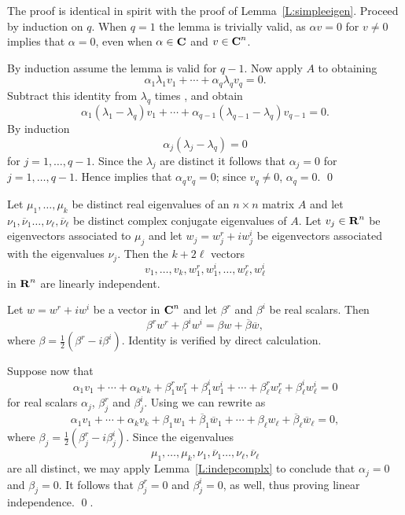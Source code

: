 \proof  The proof is identical in spirit with the proof of 
Lemma~\ref{L:simpleeigen}.  Proceed by induction on $q$.  When $q=1$ the
lemma is trivially valid, as $\alpha v=0$ for $v\neq 0$ implies that
$\alpha=0$, even when $\alpha\in\mbox{$\bf{C}$}$ and $v\in\mbox{$\bf{C}$}^n$.  

By induction assume the lemma is valid for $q-1$.  Now apply $A$ to 
 obtaining
\[
\alpha_1\lambda_1v_1 + \cdots + \alpha_q\lambda_qv_q = 0.
\]
Subtract this identity from $\lambda_q$ times , and obtain
\[
\alpha_1(\lambda_1-\lambda_q)v_1 + \cdots +
\alpha_{q-1}(\lambda_{q-1}-\lambda_q)v_{q-1} = 0.
\]
By induction 
\[
\alpha_j(\lambda_j-\lambda_q) = 0
\]
for $j=1,\ldots, q-1$.  Since the $\lambda_j$ are distinct it follows that 
$\alpha_j=0$ for $j=1,\ldots, q-1$.  Hence  implies that 
$\alpha_qv_q = 0$; since $v_q\neq 0$, $\alpha_q=0$.  \qed

\begin{lemma}  \label{L:rlcmplx}
Let $\mu_1,\ldots,\mu_k$ be distinct real eigenvalues of an $n\times n$ 
matrix $A$ and let $\nu_1,\overline{\nu}_1\ldots,\nu_\ell,\overline{\nu}_\ell$
be distinct complex conjugate eigenvalues of $A$.  Let $v_j\in\mbox{$\bf{R}$}^n$ be
eigenvectors associated to $\mu_j$ and let $w_j=w_j^r+iw_j^i$ be eigenvectors
associated with the eigenvalues $\nu_j$.  Then the $k+2\ell$ vectors 
\[
v_1,\ldots,v_k,w_1^r,w_1^i,\ldots,w_\ell^r,w_\ell^i
\]
in $\mbox{$\bf{R}$}^n$ are linearly independent.
\end{lemma}

\proof  Let $w=w^r+iw^i$ be a vector in $\mbox{$\bf{C}$}^n$ and let $\beta^r$ and
$\beta^i$ be real scalars.  Then 
\begin{equation}  \label{E:realcmplx}
\beta^rw^r + \beta^iw^i = \beta w + \overline{\beta} \overline{w},
\end{equation}
where $\beta = \frac{1}{2}(\beta^r-i\beta^i)$.  Identity  
is verified by direct calculation.

Suppose now that 
\begin{equation}  \label{E:rlcplxlc} 
\alpha_1v_1+\cdots+\alpha_kv_k + \beta_1^rw_1^r+\beta_1^iw_1^i + \cdots +
\beta_\ell^rw_\ell^r+\beta_\ell^iw_\ell^i = 0
\end{equation}
for real scalars $\alpha_j$, $\beta_j^r$ and $\beta_j^i$.  Using 
 we can rewrite  as
\[
\alpha_1v_1+\cdots+\alpha_kv_k + \beta_1w_1+\overline{\beta}_1\overline{w}_1 
+ \cdots + \beta_\ell w_\ell+\overline{\beta}_\ell\overline{w}_\ell = 0,
\]
where $\beta_j = \frac{1}{2}(\beta_j^r-i\beta_j^i)$.  Since the eigenvalues 
\[
\mu_1,\ldots,\mu_k,\nu_1,\overline{\nu}_1\ldots,\nu_\ell,\overline{\nu}_\ell
\]
are all distinct, we may apply Lemma~\ref{L:indepcomplx} to conclude that 
$\alpha_j=0$ and $\beta_j=0$.  It follows that $\beta_j^r=0$ and
$\beta_j^i=0$, as well, thus proving linear independence.  \qed. 


